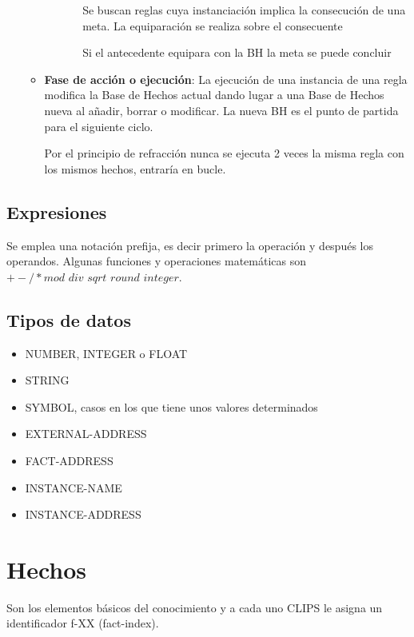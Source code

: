 \documentclass[12pt, twoside, openright]{report} %
\begin{document}
\begin{itemize}
\begin{itemize}
\begin{itemize}
\begin{itemize}
				                        Se buscan reglas cuya instanciación implica la consecución de una meta. La
				                        equiparación se realiza sobre el consecuente
				                        
				                        Si el antecedente equipara con la BH la meta se puede concluir
			                  \end{itemize}
			                  
		            \end{itemize}
		            
		            \pagebreak
		      \item \textbf{Fase de acción o ejecución}: La ejecución de una instancia de una regla modifica la Base de Hechos actual dando lugar a una Base de Hechos nueva al añadir, borrar o modificar. La nueva BH es el punto de partida para el siguiente ciclo.
		            
		            Por el principio de refracción nunca se ejecuta 2 veces la misma regla con los mismos hechos, entraría en bucle.
	      \end{itemize}
\end{itemize}

\subsection{Expresiones}
Se emplea una notación prefija, es decir primero la operación y después los operandos. Algunas funciones y operaciones matemáticas son $+ - / * \textit{mod div sqrt round integer}$.

\subsection{Tipos de datos}
\begin{itemize}
	\item NUMBER, INTEGER o FLOAT
	\item STRING
	\item SYMBOL, casos en los que tiene unos valores determinados
	\item EXTERNAL-ADDRESS
	\item FACT-ADDRESS
	\item INSTANCE-NAME
	\item INSTANCE-ADDRESS
\end{itemize}

\section{Hechos}
Son los elementos básicos del conocimiento y a cada uno CLIPS le asigna un identificador f-XX (fact-index).
\end{document}
